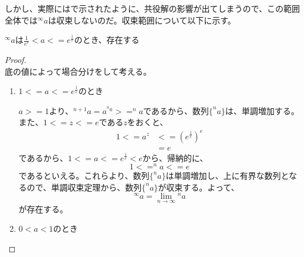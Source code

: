 	しかし、実際にはで示されたように、共役解の影響が出てしまうので、この範囲全体では$^\infty a$は収束しないのだ。収束範囲について以下に示す。
	\begin{theorem}
	\label{th:tetration_convergence}
		$^\infty a$は$\frac{1}{e^e} < a <= e^\frac{1}{e}$のとき、存在する
	\end{theorem}
	\begin{proof} \mbox{}\\
		底の値によって場合分けをして考える。
		\begin{enumerate}
			\item $1 <= a <= e^\frac{1}{e}$のとき
			
				$a >= 1$より、$^{n+1} a = a ^{^n a} >= ^n a$であるから、数列$\{^n a\}$は、単調増加する。
				また、$1 <= z <= e$である$z$をおくと、
				\begin{align*}
					1 <= a^z &<= (e^\frac{1}{e})^e \\
							 &= e
				\end{align*}
				であるから、$1 <= a <= e^\frac{1}{e} < e$から、帰納的に、
				\begin{equation*}
					1 <= ^n a <= e
				\end{equation*}
				であるといえる。これらより、数列$\{^n a\}$は単調増加し、上に有界な数列となるので、単調収束定理から、数列$\{^n a\}$が収束する。よって、
				\begin{equation*}
					^\infty a = \lim_{n \to \infty} {^n a}
				\end{equation*}
				が存在する。
			
			\item $0 < a < 1$のとき
		\end{enumerate}
	\end{proof}
	
	